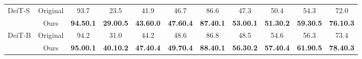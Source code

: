 \documentclass{article}
\begin{document}
\begin{table}[h!]
\begin{center}
{\begin{tabular}{@{}l@{~~}c@{~~~}c@{~~~}c@{~~~}c@{~~~}c@{~~~}c@{~~~}c@{~~~}c@{~~~}c@{~~~}c@{}}
\midrule
\multirow{2}{*}{\small DeiT-S }  &\small{Original} & 93.7 & 23.5 & 41.9 & 46.7 & 86.6 & 47.3 & 50.4 & 54.3 & 72.0 \\
&\small{Ours} & \textbf{94.50.1} & \textbf{29.00.5} & \textbf{43.60.0} & \textbf{47.60.4} & \textbf{87.40.1} & \textbf{53.00.1} & \textbf{51.30.2} & \textbf{59.30.5} & \textbf{76.10.3} \\
\midrule
\multirow{2}{*}{\small DeiT-B }


&\small{Original} & 94.2 & 31.0 & 44.2 & 48.6 & 86.8 & 48.5 & 54.6 & 56.3 & 73.4 \\ 
&\small{Ours} & \textbf{95.00.1} & \textbf{40.10.2} & \textbf{47.40.4} & \textbf{49.70.4} & \textbf{88.40.1} & \textbf{56.30.2} & \textbf{57.40.4} & \textbf{61.90.5} & \textbf{78.40.3} \\
        \bottomrule
    \end{tabular}
    }
    \smallskip
    \smallskip
    \label{table:seeds_top5}
    \end{center}
    \vspace{-24px}
\end{table}

\clearpage
\end{document}
